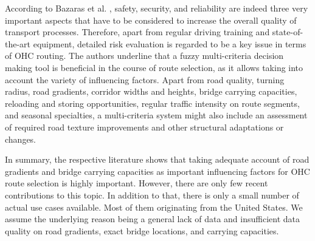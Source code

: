\par
According to Bazaras et al. \cite{Bazaras.2013}, safety, security, and reliability are indeed three very important aspects that have to be considered to increase the overall quality of transport processes. Therefore, apart from regular driving training and state-of-the-art equipment, detailed risk evaluation is regarded to be a key issue in terms of OHC routing. The authors underline that a fuzzy multi-criteria decision making tool is beneficial in the course of route selection, as it allows taking into account the variety of influencing factors. Apart from road quality, turning radius, road gradients, corridor widths and heights, bridge carrying capacities, reloading and storing opportunities, regular traffic intensity on route segments, and seasonal specialties, a multi-criteria system might also include an assessment of required road texture improvements and other structural adaptations or changes.
\par
In summary, the respective literature shows that taking adequate account of road gradients and bridge carrying capacities as important influencing factors for OHC route selection is highly important. However, there are only few recent contributions to this topic. In addition to that, there is only a small number of actual use cases available. Most of them originating from the United States. We assume the underlying reason being a general lack of data and insufficient data quality on road gradients, exact bridge locations, and carrying capacities.



%
%
%
%

